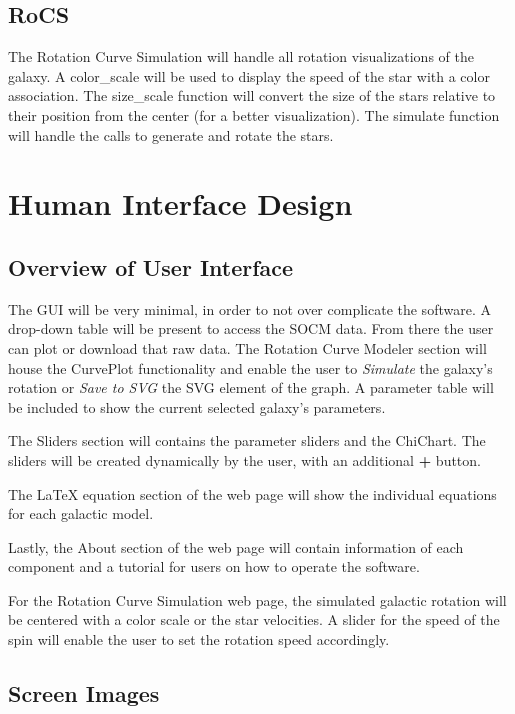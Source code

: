 \documentclass[titlepage]{article}
\begin{document}
\subsection{RoCS}
The Rotation Curve Simulation will handle all rotation visualizations of the galaxy. A color\_scale will be used to display the speed of the star with a color association. The size\_scale function will convert the size of the stars relative to their position from the center (for a better visualization). The simulate function will handle the calls to generate and rotate the stars. 


\section{Human Interface Design}
\subsection{Overview of User Interface}
The GUI will be very minimal, in order to not over complicate the software. A drop-down table will be present to access the SOCM data. From there the user can plot or download that raw data. The Rotation Curve Modeler section will house the CurvePlot functionality and enable the user to \textit{Simulate} the galaxy's rotation or \textit{Save to SVG} the SVG element of the graph. A parameter table will be included to show the current selected galaxy's parameters.

The Sliders section will contains the parameter sliders and the ChiChart. The sliders will be created dynamically by the user, with an additional \textbf{+} button. 

The \LaTeX \- equation section of the web page will show the individual equations for each galactic model. 

Lastly, the About section of the web page will contain information of each component and a tutorial for users on how to operate the software.

For the Rotation Curve Simulation web page, the simulated galactic rotation will be centered with a color scale or the star velocities. A slider for the speed of the spin will enable the user to set the rotation speed accordingly.

\subsection{Screen Images}
\end{document}
